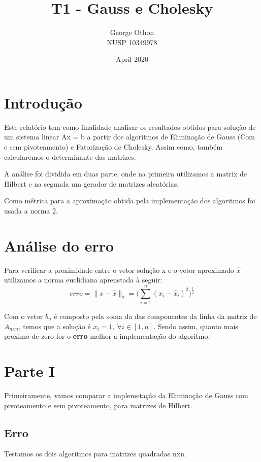 \documentclass{article}
\title{T1 - Gauss e Cholesky}
\author{George Othon\\NUSP 10349978}
\date{April 2020}
\begin{document}
\maketitle

\section{Introdução}
\par Este relatório tem como finalidade analisar os resultados obtidos para solução de um sistema linear Ax = b a partir dos algoritmos de Eliminação de Gauss (Com e sem pivoteamento) e Fatorização de Cholesky. Assim como, também calcularemos o determinante das matrizes.
\par A análise foi dividida em duas parte, onde na primeira utilizamos a matrix de Hilbert e na segunda um gerador de matrizes aleatórias.
\par Como métrica para a aproximação obtida pela implementação dos algoritmos foi usada a norma 2.

\section{Análise do erro}
Para verificar a proximidade entre o vetor solução x e o vetor aproximado $\hat{x}$ utilizamos a norma euclidiana aprenstada à seguir:
$$
{\displaystyle erro = \|x - \hat{x}\|_{2}={\Big (}\sum _{i=1}^{n}(x_{i} - \hat x_{i} )^2{\Big )}^{\frac {1}{2}}}
$$

\par Com o vetor $b_n$ é composto pela soma da das componentes da linha da matriz de $A_{nxn}$, temos que a solução é $x_i = 1, \ \forall i \in [1,n]$. Sendo assim, quanto mais proximo de zero for o \textbf{erro} melhor a implementação do algoritmo.

\section{Parte I}
Primeiramente, vamos comparar a implemetação da Eliminação de Gauss com pivoteamento e sem pivoteamento, para matrizes de Hilbert.
\newpage

\subsection{Erro}

\par Testamos os dois algoritmos para matrizes quadradas nxn.

\end{document}
